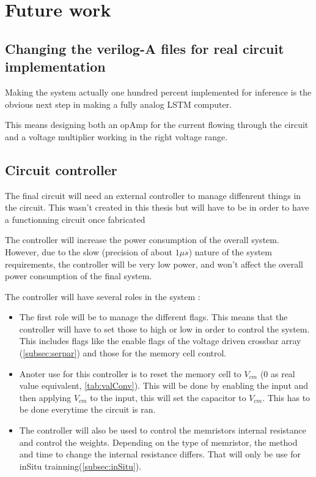 \section{Future work}\label{sec:further}

\subsection{Changing the verilog-A files for real circuit implementation}

Making the system actually one hundred percent implemented for inference is the obvious next step in making a fully analog \ac{LSTM} computer.

This means designing both an \ac{opAmp} for the current flowing through the circuit and a voltage multiplier working in the right voltage range.

\subsection{Circuit controller}\label{subsec:control}

The final circuit will need an external controller to manage diffenrent things in the circuit. This wasn't created in this thesis but will have to be in order to have a functionning circuit once fabricated %

The controller will increase the power consumption of the overall system. However, due to the slow (precision of about $1\mu s$) nature of the system requirements, the controller will be very low power, and won't affect the overall power consumption of the final system.

The controller will have several roles in the system :
\begin{itemize}
  \item The first role will be to manage the different flags. This means that the controller will have to set those to high or low in order to control the system. This includes flags like the enable flags of the voltage driven crossbar array (\cref{subsec:serpar}) and those for the memory cell control.
  \item Anoter use for this controller is to reset the memory cell to $V_{cm}$ ($0$ as real value equivalent, \cref{tab:valConv}). This will be done by enabling the input and then applying $V_{cm}$ to the input, this will set the capacitor to $V_{cm}$. This has to be done everytime the circuit is ran.
  \item The controller will also be used to control the memristors internal resistance and control the weights. Depending on the type of memristor, the method and time to change the internal resistance differs. That will only be use for inSitu trainning(\cref{subsec:inSitu}).
\end{itemize}

